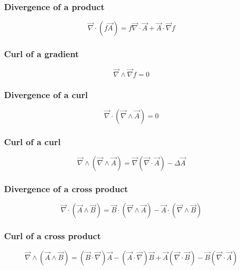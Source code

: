 \subsubsection{Divergence of a product}
\begin{equation}
	\vec{\nabla} \cdot \left( f \vec{A} \right) = f \vec{\nabla} \cdot \vec{A} + \vec{A} \cdot \vec{\nabla} f
\end{equation}

\subsubsection{Curl of a gradient}
\begin{equation}
	\vec{\nabla} \wedge \vec{\nabla} f = 0
\end{equation}

\subsubsection{Divergence of a curl}
\begin{equation}
	\vec{\nabla} \cdot \left(\vec{\nabla} \wedge \vec{A}\right) = 0
\end{equation}

\subsubsection{Curl of a curl}
\begin{equation}
	\vec{\nabla} \wedge \left( \vec{\nabla} \wedge \vec{A} \right) = \vec{\nabla} \left( \vec{\nabla} \cdot \vec{A} \right) - \Delta \vec{A}
\end{equation}

\subsubsection{Divergence of a cross product}
\begin{equation}
	\vec{\nabla} \cdot \left( \vec{A} \wedge \vec{B} \right) = \vec{B} \cdot \left( \vec{\nabla} \wedge \vec{A} \right) - \vec{A} \cdot \left( \vec{\nabla} \wedge \vec{B} \right)
\end{equation}

\subsubsection{Curl of a cross product}
\begin{equation}
	\vec{\nabla} \wedge \left( \vec{A} \wedge \vec{B} \right) =  \left(\vec{B} \cdot \vec{\nabla} \right) \vec{A} - \left(\vec{A} \cdot \vec{\nabla} \right) \vec{B}  + \vec{A} \left( \vec{\nabla} \cdot \vec{B} \right) - \vec{B} \left( \vec{\nabla} \cdot \vec{A} \right)
\end{equation}